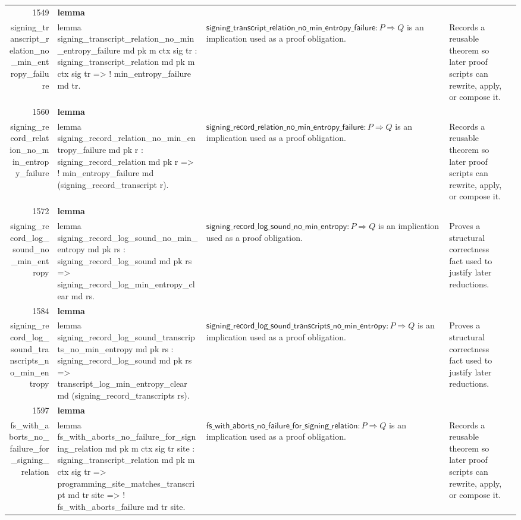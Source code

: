 \documentclass[10pt]{article}
\newcommand{\ec}[1]{\begingroup\ttfamily\scriptsize #1\endgroup}
\begin{document}
\begin{longtable}{r L{0.17\textwidth} L{0.26\textwidth} L{0.27\textwidth} L{0.20\textwidth}}
1549 & \textbf{lemma}\\\ec{signing\_transcript\_relation\_no\_min\_entropy\_failure} & \ec{lemma signing\_transcript\_relation\_no\_min\_entropy\_failure md pk m ctx sig tr : signing\_transcript\_relation md pk m ctx sig tr => ! min\_entropy\_failure md tr.} & \(\mathsf{signing\_transcript\_relation\_no\_min\_entropy\_failure} : P \Rightarrow Q\) is an implication used as a proof obligation. & Records a reusable theorem so later proof scripts can rewrite, apply, or compose it. \\
1560 & \textbf{lemma}\\\ec{signing\_record\_relation\_no\_min\_entropy\_failure} & \ec{lemma signing\_record\_relation\_no\_min\_entropy\_failure md pk r : signing\_record\_relation md pk r => ! min\_entropy\_failure md (signing\_record\_transcript r).} & \(\mathsf{signing\_record\_relation\_no\_min\_entropy\_failure} : P \Rightarrow Q\) is an implication used as a proof obligation. & Records a reusable theorem so later proof scripts can rewrite, apply, or compose it. \\
1572 & \textbf{lemma}\\\ec{signing\_record\_log\_sound\_no\_min\_entropy} & \ec{lemma signing\_record\_log\_sound\_no\_min\_entropy md pk rs : signing\_record\_log\_sound md pk rs => signing\_record\_log\_min\_entropy\_clear md rs.} & \(\mathsf{signing\_record\_log\_sound\_no\_min\_entropy} : P \Rightarrow Q\) is an implication used as a proof obligation. & Proves a structural correctness fact used to justify later reductions. \\
1584 & \textbf{lemma}\\\ec{signing\_record\_log\_sound\_transcripts\_no\_min\_entropy} & \ec{lemma signing\_record\_log\_sound\_transcripts\_no\_min\_entropy md pk rs : signing\_record\_log\_sound md pk rs => transcript\_log\_min\_entropy\_clear md (signing\_record\_transcripts rs).} & \(\mathsf{signing\_record\_log\_sound\_transcripts\_no\_min\_entropy} : P \Rightarrow Q\) is an implication used as a proof obligation. & Proves a structural correctness fact used to justify later reductions. \\
1597 & \textbf{lemma}\\\ec{fs\_with\_aborts\_no\_failure\_for\_signing\_relation} & \ec{lemma fs\_with\_aborts\_no\_failure\_for\_signing\_relation md pk m ctx sig tr site : signing\_transcript\_relation md pk m ctx sig tr => programming\_site\_matches\_transcript md tr site => ! fs\_with\_aborts\_failure md tr site.} & \(\mathsf{fs\_with\_aborts\_no\_failure\_for\_signing\_relation} : P \Rightarrow Q\) is an implication used as a proof obligation. & Records a reusable theorem so later proof scripts can rewrite, apply, or compose it. \\

\end{longtable}
\end{document}
